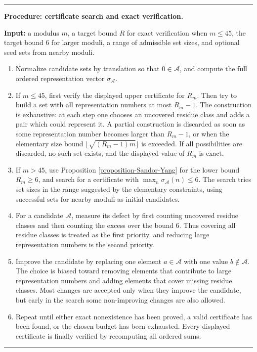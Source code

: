 \documentclass[12pt,a4paper,reqno]{amsart}
\numberwithin{equation}{section}
\theoremstyle{plain}
\theoremstyle{definition}
\begin{document}
\medskip
\noindent
\begin{minipage}{\textwidth}
\hrule
\smallskip
\textbf{Procedure: certificate search and exact verification.}

\textbf{Input:} a modulus \(m\), a target bound \(R\) for exact verification when
\(m\le45\), the target bound \(6\) for larger moduli, a range of admissible set sizes,
and optional seed sets from nearby moduli.

\begin{enumerate}
\item Normalize candidate sets by translation so that \(0\in\mathcal{A}\), and compute
the full ordered representation vector \(\sigma_\mathcal{A}\).
\item If \(m\le45\), first verify the displayed upper certificate for \(R_m\).  Then try
to build a set with all representation numbers at most \(R_m-1\).  The construction
is exhaustive: at each step one chooses an uncovered residue class and adds a pair
which could represent it.  A partial construction is discarded as soon as some
representation number becomes larger than \(R_m-1\), or when the elementary size
bound \(\lfloor\sqrt{(R_m-1)m}\rfloor\) is exceeded.  If all possibilities are
discarded, no such set exists, and the displayed value of \(R_m\) is exact.
\item If \(m>45\), use Proposition \ref{proposition-Sandor-Yang} for the lower bound
\(R_m\ge6\), and search for a certificate with \(\max_n\sigma_\mathcal{A}(n)\le6\).
The search tries set sizes in the range suggested by the elementary constraints,
using successful sets for nearby moduli as initial candidates.
\item For a candidate \(\mathcal{A}\), measure its defect by first counting uncovered
residue classes and then counting the excess over the bound \(6\).  Thus covering all
residue classes is treated as the first priority, and reducing large representation
numbers is the second priority.
\item Improve the candidate by replacing one element \(a\in\mathcal{A}\) with one
value \(b\notin\mathcal{A}\).  The choice is biased toward removing elements that
contribute to large representation numbers and adding elements that cover missing
residue classes.  Most changes are accepted only when they improve the candidate, but
early in the search some non-improving changes are also allowed.
\item Repeat until either exact nonexistence has been proved, a valid certificate has
been found, or the chosen budget has been exhausted.  Every displayed
certificate is finally verified by recomputing all ordered sums.
\end{enumerate}
\smallskip
\hrule
\end{minipage}
\medskip
\end{document}
